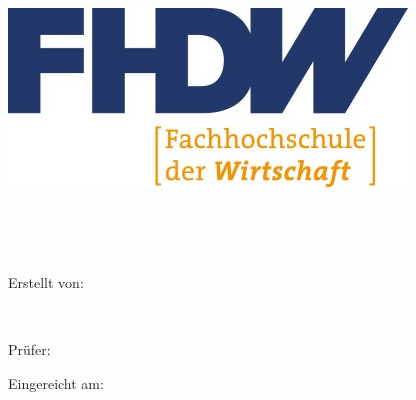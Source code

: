 
\begin{titlepage}

\begin{center}


\includegraphics[scale=.5]{img/fhdw.jpg}\\

\vspace{.7cm}

\Huge{\bfseries\dokumententyp}

~\vspace{.5cm}\\

\LARGE{\dokumententitel}

~\vspace{1.2cm}\\


\large{

Erstellt von:\\\vspace{1mm}

\dokumentenautor\\

\dokumentenautoradress


\vspace{1.3cm}

Prüfer:\vspace{1mm}\\

\dokumentenpruefer


\vspace{1.3cm}

Eingereicht am:\vspace{1mm}\\

\abgabedatum

}

\end{center}


\end{titlepage}

